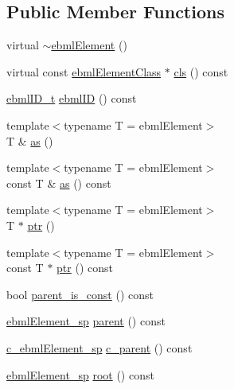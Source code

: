 \subsection*{Public Member Functions}
\begin{DoxyCompactItemize}
\item 
virtual \mbox{\hyperlink{classebml_1_1ebmlElement_a2098d59a92f38d5ab5dbad0c7611115a}{$\sim$ebml\+Element}} ()
\item 
virtual const \mbox{\hyperlink{classebml_1_1ebmlElementClass}{ebml\+Element\+Class}} $\ast$ \mbox{\hyperlink{classebml_1_1ebmlElement_a15cf59e94b01e2c49ec96512b9bd9d90}{cls}} () const
\item 
\mbox{\hyperlink{namespaceebml_a86c5f604ddf12a74aa9812e997a58691}{ebml\+I\+D\+\_\+t}} \mbox{\hyperlink{classebml_1_1ebmlElement_afb2aa40757e663892d3a079de0f4e7d6}{ebml\+ID}} () const
\item 
{\footnotesize template$<$typename T  = ebml\+Element$>$ }\\T \& \mbox{\hyperlink{classebml_1_1ebmlElement_a607040308ec26d2a8cc75ba30306fe1c}{as}} ()
\item 
{\footnotesize template$<$typename T  = ebml\+Element$>$ }\\const T \& \mbox{\hyperlink{classebml_1_1ebmlElement_a5187388f244c6432a6ba89eac91e20ea}{as}} () const
\item 
{\footnotesize template$<$typename T  = ebml\+Element$>$ }\\T $\ast$ \mbox{\hyperlink{classebml_1_1ebmlElement_a2229659406e42a5d5e9204b5e10451c7}{ptr}} ()
\item 
{\footnotesize template$<$typename T  = ebml\+Element$>$ }\\const T $\ast$ \mbox{\hyperlink{classebml_1_1ebmlElement_a657258ef3296239556ed387c6a8d9672}{ptr}} () const
\item 
bool \mbox{\hyperlink{classebml_1_1ebmlElement_a2284de40bfd5b67a7668066a0f816296}{parent\+\_\+is\+\_\+const}} () const
\item 
\mbox{\hyperlink{namespaceebml_adad533b7705a16bb360fe56380c5e7be}{ebml\+Element\+\_\+sp}} \mbox{\hyperlink{classebml_1_1ebmlElement_a7b47b4c43f09c62f56ba326b906fe718}{parent}} () const
\item 
\mbox{\hyperlink{namespaceebml_a2deef4e8071531b32e3533f1bf978917}{c\+\_\+ebml\+Element\+\_\+sp}} \mbox{\hyperlink{classebml_1_1ebmlElement_a1254e41a77ff0157b76db8f33ad7d229}{c\+\_\+parent}} () const
\item 
\mbox{\hyperlink{namespaceebml_adad533b7705a16bb360fe56380c5e7be}{ebml\+Element\+\_\+sp}} \mbox{\hyperlink{classebml_1_1ebmlElement_a9c9ed1823c036c8a77a64c68e12e769f}{root}} () const

\end{DoxyCompactItemize}
